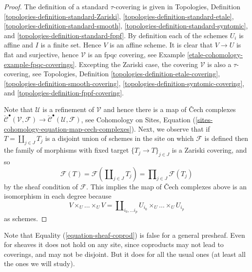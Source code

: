 \begin{proof}
The definition of a standard $\tau$-covering is given in
Topologies, Definition
\ref{topologies-definition-standard-Zariski},
\ref{topologies-definition-standard-etale},
\ref{topologies-definition-standard-smooth},
\ref{topologies-definition-standard-syntomic}, and
\ref{topologies-definition-standard-fppf}.
By definition each of the schemes
$U_i$ is affine and $I$ is a finite set. Hence $V$ is an affine scheme.
It is clear that $V \to U$ is flat and surjective, hence
$\mathcal{V}$ is an fpqc covering, see
Example \ref{etale-cohomology-example-fpqc-coverings}.
Excepting the Zariski case, the covering $\mathcal{V}$
is also a $\tau$-covering, see
Topologies, Definition
\ref{topologies-definition-etale-covering},
\ref{topologies-definition-smooth-covering},
\ref{topologies-definition-syntomic-covering}, and
\ref{topologies-definition-fppf-covering}.

\medskip\noindent
Note that $\mathcal{U}$ is a refinement of $\mathcal{V}$
and hence there is a map of {\v C}ech complexes
$\check{\mathcal{C}}^\bullet (\mathcal{V}, \mathcal{F}) \to
\check{\mathcal{C}}^\bullet (\mathcal{U}, \mathcal{F})$, see
Cohomology on Sites,
Equation (\ref{sites-cohomology-equation-map-cech-complexes}).
Next, we observe that if $T = \coprod_{j \in J} T_j$ is a
disjoint union of schemes in the site on which $\mathcal{F}$ is defined
then the family of morphisms with fixed target
$\{T_j \to T\}_{j \in J}$ is a Zariski covering, and so
\begin{equation}
\label{equation-sheaf-coprod}
\mathcal{F}(T) =
\mathcal{F}(\coprod\nolimits_{j \in J} T_j) =
\prod\nolimits_{j \in J} \mathcal{F}(T_j)
\end{equation}
by the sheaf condition of $\mathcal{F}$.
This implies the map of {\v C}ech complexes above is an isomorphism
in each degree because
$$
V \times_U \ldots \times_U V
=
\coprod\nolimits_{i_0, \ldots i_p} U_{i_0} \times_U \ldots \times_U U_{i_p}
$$
as schemes.
\end{proof}

Note that Equality (\ref{equation-sheaf-coprod})
is false for a general presheaf. Even for sheaves it does not hold on any
site, since coproducts may not lead to coverings, and may not be disjoint.
But it does for all the usual ones (at least all the ones we will study).

